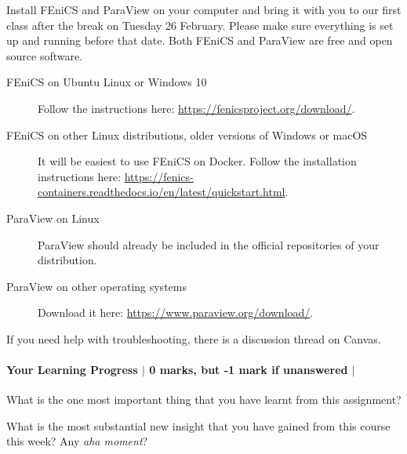 \documentclass[10pt,letterpaper]{scrartcl}
\begin{document}
Install \textsf{FEniCS} and \textsf{ParaView} on your computer and bring it with you to our first class after the break on Tuesday 26 February. Please make sure everything is set up and running before that date. Both \textsf{FEniCS} and \textsf{ParaView} are free and open source software.

\begin{description}
\item[FEniCS on Ubuntu Linux or Windows 10] Follow the instructions here: \url{https://fenicsproject.org/download/}.
\item[FEniCS on other Linux distributions, older versions of Windows or macOS] It will be easiest to use \textsf{FEniCS} on \textsf{Docker}. Follow the installation instructions here: \url{https://fenics-containers.readthedocs.io/en/latest/quickstart.html}.
\item[ParaView on Linux] \textsf{ParaView} should already be included in the official repositories of your distribution.
\item[ParaView on other operating systems] Download it here: \url{https://www.paraview.org/download/}.
\end{description}
If you need help with troubleshooting, there is a discussion thread on \textsf{Canvas}.

\paragraph*{Your Learning Progress $\vert$ 0 marks, but -1 mark if unanswered $\vert$ \faFilePdfO}
What is the one most important thing that you have learnt from this assignment?

\vspace*{3mm}
\hrulefill

\vspace*{3mm}
\hrulefill

\vspace*{3mm}
\hrulefill

What is the most substantial new insight that you have gained from this course this week? Any \emph{aha moment}?

\vspace*{3mm}
\hrulefill

\vspace*{3mm}
\hrulefill

\vspace*{3mm}
\hrulefill
\end{document}
